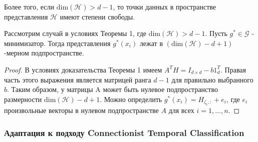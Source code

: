 Более того, если $\text{dim}(\mathcal{H}) > d-1$, то точки данных в пространстве представления $\mathcal{H}$ имеют степени свободы.

\begin{theorem}
Рассмотрим случай в условиях Теоремы 1, где $\text{dim}(\mathcal{H}) > d - 1$. Пусть $g^{*} \in \mathcal{G}$ - минимизатор. Тогда представления $g^{*}(x_i)$ лежат в $(\text{dim}(\mathcal{H}) - d + 1)$-мерном подпространстве.
\end{theorem}

\begin{proof}
В условиях доказательства Теоремы 1 имеем $A^T H = I_{d \times d} - b 1_{d}^{T}$. Правая часть этого выражения является матрицей ранга $d - 1$ для правильно выбранного $b$. Таким образом, у матрицы A может быть нулевое подпространство размерности $\text{dim}(\mathcal{H}) - d + 1$. Можно определить $g^{*}(x_i) = H_{\zeta_i,:} + e_i$, где $e_i$ произвольные векторы в нулевом подпространстве $A$ для всех $i = 1, ..., n$.
\end{proof}

\subsubsection{Адаптация к подходу Connectionist Temporal Classification}


\newpage
